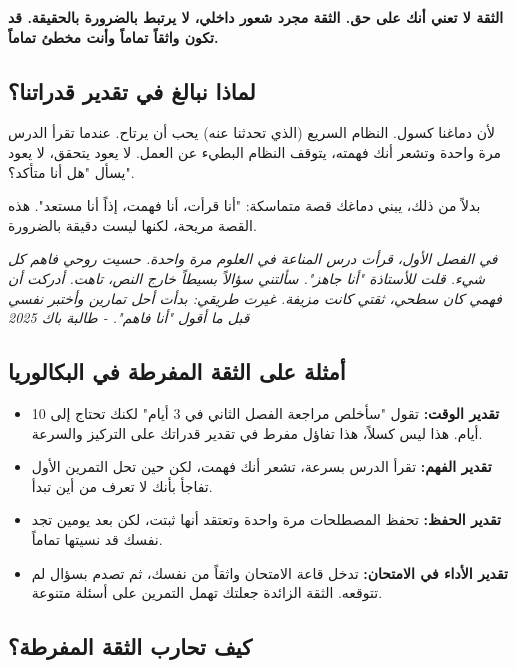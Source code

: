 \documentclass[12pt,a4paper]{book}
\newcommand{\quoteAr}[1]{%
	\begin{myquote}
		\itshape #1
	\end{myquote}
}
\newcommand{\importantAr}[1]{%
	\begin{important}
		\bfseries #1
	\end{important}
}
\begin{document}
\importantAr{الثقة لا تعني أنك على حق. الثقة مجرد شعور داخلي، لا يرتبط بالضرورة بالحقيقة. قد تكون واثقاً تماماً وأنت مخطئ تماماً.}

\subsection{لماذا نبالغ في تقدير قدراتنا؟}

لأن دماغنا كسول. النظام السريع (الذي تحدثنا عنه) يحب أن يرتاح. عندما تقرأ الدرس مرة واحدة وتشعر أنك فهمته، يتوقف النظام البطيء عن العمل. لا يعود يتحقق، لا يعود يسأل "هل أنا متأكد؟".

بدلاً من ذلك، يبني دماغك قصة متماسكة: "أنا قرأت، أنا فهمت، إذاً أنا مستعد". هذه القصة مريحة، لكنها ليست دقيقة بالضرورة.

\quoteAr{في الفصل الأول، قرأت درس المناعة في العلوم مرة واحدة. حسيت روحي فاهم كل شيء. قلت للأستاذة "أنا جاهز". سألتني سؤالاً بسيطاً خارج النص، تاهت. أدركت أن فهمي كان سطحي، ثقتي كانت مزيفة. غيرت طريقي: بدأت أحل تمارين وأختبر نفسي قبل ما أقول "أنا فاهم". - طالبة باك 2025}

\subsection{أمثلة على الثقة المفرطة في البكالوريا}

\begin{itemize}
	\item \textbf{تقدير الوقت:} تقول "سأخلص مراجعة الفصل الثاني في 3 أيام" لكنك تحتاج إلى 10 أيام. هذا ليس كسلاً، هذا تفاؤل مفرط في تقدير قدراتك على التركيز والسرعة.
	
	\item \textbf{تقدير الفهم:} تقرأ الدرس بسرعة، تشعر أنك فهمت، لكن حين تحل التمرين الأول تفاجأ بأنك لا تعرف من أين تبدأ.
	
	\item \textbf{تقدير الحفظ:} تحفظ المصطلحات مرة واحدة وتعتقد أنها ثبتت، لكن بعد يومين تجد نفسك قد نسيتها تماماً.
	
	\item \textbf{تقدير الأداء في الامتحان:} تدخل قاعة الامتحان واثقاً من نفسك، ثم تصدم بسؤال لم تتوقعه. الثقة الزائدة جعلتك تهمل التمرين على أسئلة متنوعة.
\end{itemize}

\subsection{كيف تحارب الثقة المفرطة؟}
\end{document}
